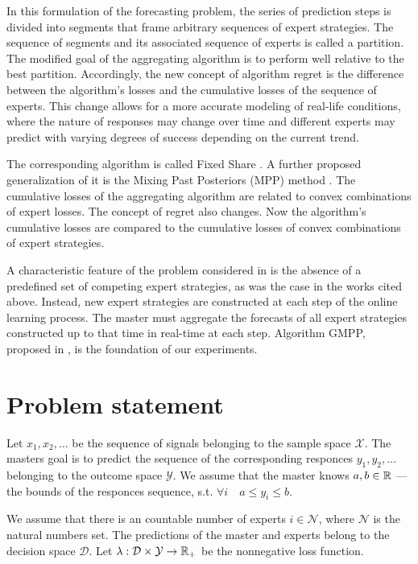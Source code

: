 \documentclass[12pt, twoside]{article}
\begin{document}
In this formulation of the forecasting problem, the series of prediction steps is divided into segments that frame arbitrary sequences of expert strategies. 
The sequence of segments and its associated sequence of experts is called a partition. 
The modified goal of the aggregating algorithm is to perform well relative to the best partition. 
Accordingly, the new concept of algorithm regret is the difference between the algorithm's losses and the cumulative losses of the sequence of experts. 
This change allows for a more accurate modeling of real-life conditions, where the nature of responses may change over time and different experts may predict with varying degrees of success depending on the current trend. 

The corresponding algorithm is called Fixed Share \cite{article98}. 
A further proposed generalization of it is the Mixing Past Posteriors (MPP) method \cite{article02}. 
The cumulative losses of the aggregating algorithm are related to convex combinations of expert losses. 
The concept of regret also changes. 
Now the algorithm's cumulative losses are compared to the cumulative losses of convex combinations of expert strategies.

A characteristic feature of the problem considered in \cite{article} is the absence of a predefined set of competing expert strategies, as was the case in the works cited above.
Instead, new expert strategies are constructed at each step of the online learning process.
The master must aggregate the forecasts of all expert strategies constructed up to that time in real-time at each step. 
Algorithm GMPP, proposed in \cite{article}, is the foundation of our experiments. 

\section{Problem statement}
Let $x_1, x_2, \dots$ be the sequence of signals belonging to the sample space  $\mathcal{X}$. 
The masters goal is to predict the sequence of the corresponding responces $y_1, y_2, \dots$ belonging to the outcome space $\mathcal{Y}$. 
We assume that the master knows $a, b \in \mathbb{R}$ --- the bounds of the responces sequence, s.t. $\forall i\quad a \leq y_i \leq b$.

We assume that there is an countable number of experts $i \in \mathcal{N}$, where $\mathcal{N}$ is the natural numbers set. 
The predictions of the master and experts belong to the decision space $\mathcal{D}$. 
Let $ \lambda: \mathcal{D} \times \mathcal{Y} \rightarrow \RR_+$ be the nonnegative loss function. 
\end{document}
